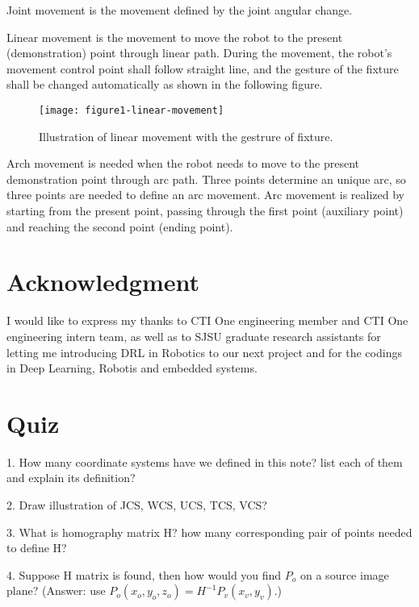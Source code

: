 \documentclass[conference]{IEEEtran}
\begin{document}
Joint movement is the movement defined by the joint angular 
change. 

Linear movement is the movement to move the robot to the present (demonstration) 
point through linear path. During the movement, the
robot’s movement control point shall follow straight line, and the gesture of 
the fixture shall be
changed automatically as shown in the following figure. 

\begin{figure}[H] 
\centering
\texttt{[image: figure1-linear-movement]}  
\caption{Illustration of linear movement with the gestrure of fixture.}
\label{figure1-linear-movement} 
\end{figure}

Arch movement is needed when 
the robot needs to move to the present demonstration point through arc path. 
Three points determine an unique arc, so three points are needed to 
define an arc movement.
Arc movement is realized by starting from the present point, passing 
through the first point (auxiliary
point) and reaching the second point (ending point).  
 
\section*{Acknowledgment}

I would like to express my thanks to CTI One engineering member and 
CTI One engineering intern team, as well as to SJSU graduate research assistants 
for letting me introducing DRL in Robotics to our next project and for the 
codings in Deep Learning, Robotis and embedded systems. 

\section*{Quiz}

1. How many coordinate systems have we defined in this note? list each of them
and explain its definition? 

2. Draw illustration of JCS, WCS, UCS, TCS, VCS? 

3. What is homography matrix H? how many corresponding pair of points needed
to define H? 

4. Suppose H matrix is found, then how would you find  
$P_{o}$ on a source image plane? 
(Answer: use 
$P_{o}(x_o,y_o,z_o) = H^{-1} P_v(x_v,y_v)$.)
\end{document}
